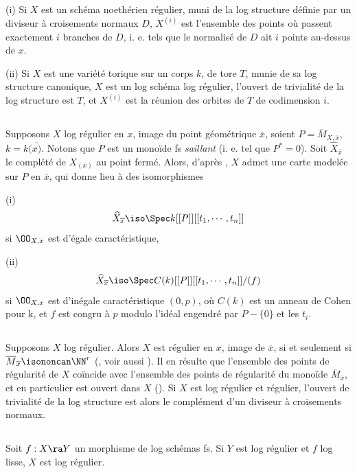 \documentclass[10pt]{../fichiers-configuration-latex/smfart}
\begin{document}
(i) Si $X$ est un schéma noethérien régulier, muni de la log structure définie par un diviseur à
croisements normaux $D$, $X^{(i)}$ est l'ensemble des points où passent exactement $i$ branches de
$D$, i. e. tels que le normalisé de $D$ ait $i$ points au-dessus de $x$.

(ii) Si $X$ est une variété torique sur un corps $k$, de tore $T$, munie de sa log structure
canonique, $X$ est un log schéma log régulier, l'ouvert de trivialité de la log structure est $T$,
et $X^{(i)}$ est la réunion des orbites de $T$ de codimension $i$.  \subsection{}\label{6-str loc
log rég}\label{6-str loc log reg} Supposons $X$ log régulier en $x$, image du point géométrique
$\overline{x}$, soient $P = \overline{M}_{X,\overline{x}}$, $k = k(\overline{x)}$. Notons que $P$
est un monoïde fs \textit{saillant} (i. e. tel que $P^* = 0$). Soit $\widehat  X_{\overline{x}}$ le
complété de $X_{(\overline{x})}$ au point fermé. Alors, d'après \cite[3.2]{Toric@Kato}, $X$ admet
une carte modelée sur $P$ en $\overline{x}$, qui donne lieu à des isomorphismes

(i) $$ \widehat  X_{\overline{x}} \iso \Spec k[[P]][[t_1,\cdots,t_n]] $$ si $\OO_{X,x}$ est
d'égale caractéristique,

(ii) $$ \widehat  X_{\overline{x}} \iso \Spec C(k)[[P]][[t_1,\cdots,t_n]]/(f) $$ si
$\OO_{X,x}$ est d'inégale caractéristique $(0,p)$, où $C(k)$ est un anneau de Cohen pour k,
et $f$ est congru à $p$ modulo l'idéal engendré par $P- \{0\}$ et les $t_i$.
\subsection{}\label{6-1.7} Supposons $X$ log régulier. Alors $X$ est régulier en $x$, image de
$\overline{x}$, si et seulement si $\overline{M}_{\overline{x}} \isononcan \NN^r$
(\cite[5.2]{Toric@Niziol}, voir aussi \cite [1.8]{LR@Vidal}). Il en résulte que l'ensemble des
points de régularité de $X$ coïncide avec l'ensemble des points de régularité du monoïde
$\overline{M}_{\overline{x}}$, et en particulier est ouvert dans $X$ (\cite[5.3]{Toric@Niziol}). Si
$X$ est log régulier et régulier, l'ouvert de trivialité de la log structure est alors le complément
d'un diviseur à croisements normaux.  \subsection{} Soit $f : X \ra Y$ un morphisme de log schémas
fs. Si $Y$ est log régulier et $f$ log lisse, $X$ est log régulier.
\end{document}
